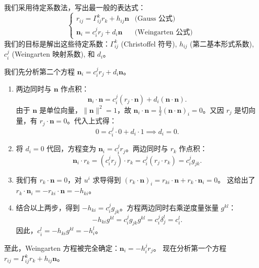 \documentclass[lang=cn,10pt,thmcnt=section]{elegantbook}
\renewcommand{\vec}[1]{\mathbf{#1}}
\begin{document}
我们采用待定系数法，写出最一般的表达式：
\[
\begin{cases}
r_{ij} = \Gamma_{ij}^k r_k + h_{ij} \vec{n} & \text{(Gauss 公式)} \\
\vec{n}_i = c_i^j r_j + d_i \vec{n} & \text{(Weingarten 公式)}
\end{cases}
\]
我们的目标是解出这些待定系数：$\Gamma_{ij}^k$ (Christoffel 符号), $h_{ij}$ (第二基本形式系数), $c_i^j$ (Weingarten 映射系数), 和 $d_i$。

我们先分析第二个方程 $\vec{n}_i = c_i^j r_j + d_i \vec{n}$。
\begin{enumerate}
    \item 两边同时与 $\vec{n}$ 作点积：
    \[ \vec{n}_i \cdot \vec{n} = c_i^j (r_j \cdot \vec{n}) + d_i (\vec{n} \cdot \vec{n}). \]
    由于 $\vec{n}$ 是单位向量，$\|\vec{n}\|^2=1$，故 $\vec{n}_i \cdot \vec{n} = \frac{1}{2}(\vec{n}\cdot\vec{n})_i = 0$。又因 $r_j$ 是切向量，有 $r_j \cdot \vec{n} = 0$。代入上式得：
    \[ 0 = c_i^j \cdot 0 + d_i \cdot 1 \implies d_i = 0. \]
    
    \item 将 $d_i=0$ 代回，方程变为 $\vec{n}_i = c_i^j r_j$。两边同时与 $r_k$ 作点积：
    \[ \vec{n}_i \cdot r_k = (c_i^j r_j) \cdot r_k = c_i^j (r_j \cdot r_k) = c_i^j g_{jk}. \]
    
    \item 我们有 $r_k \cdot \vec{n} = 0$，对 $u^i$ 求导得到 $(r_k \cdot \vec{n})_i = r_{ki} \cdot \vec{n} + r_k \cdot \vec{n}_i = 0$。
    这给出了 $r_k \cdot \vec{n}_i = -r_{ki} \cdot \vec{n} = -h_{ki}$。
    
    \item 结合以上两步，得到 $-h_{ki} = c_i^j g_{jk}$。方程两边同时右乘逆度量张量 $g^{kl}$：
    \[ -h_{ki} g^{kl} = c_i^j g_{jk} g^{kl} = c_i^j \delta_j^l = c_i^l. \]
    因此，$c_i^l = -h_{ki} g^{kl} = -h_i^l$。
\end{enumerate}
至此，Weingarten 方程被完全确定：$\boxed{\vec{n}_i = -h_i^j r_j}$。
现在分析第一个方程 $r_{ij} = \Gamma_{ij}^k r_k + h_{ij} \vec{n}$。
\end{document}
